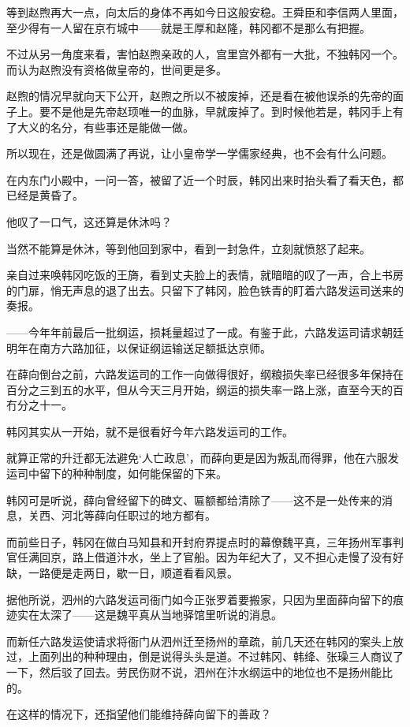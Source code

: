 等到赵煦再大一点，向太后的身体不再如今日这般安稳。王舜臣和李信两人里面，至少得有一人留在京冇城中——就是王厚和赵隆，韩冈都不是那么有把握。

不过从另一角度来看，害怕赵煦亲政的人，宫里宫外都有一大批，不独韩冈一个。而认为赵煦没有资格做皇帝的，世间更是多。

赵煦的情况早就向天下公开，赵煦之所以不被废掉，还是看在被他误杀的先帝的面子上。要不是他是先帝赵顼唯一的血脉，早就废掉了。到时候他若是，韩冈手上有了大义的名分，有些事还是能做一做。

所以现在，还是做圆满了再说，让小皇帝学一学儒家经典，也不会有什么问题。

在内东门小殿中，一问一答，被留了近一个时辰，韩冈出来时抬头看了看天色，都已经是黄昏了。

他叹了一口气，这还算是休沐吗？

当然不能算是休沐，等到他回到家中，看到一封急件，立刻就愤怒了起来。

亲自过来唤韩冈吃饭的王旖，看到丈夫脸上的表情，就暗暗的叹了一声，合上书房的门扉，悄无声息的退了出去。只留下了韩冈，脸色铁青的盯着六路发运司送来的奏报。

——今年年前最后一批纲运，损耗量超过了一成。有鉴于此，六路发运司请求朝廷明年在南方六路加征，以保证纲运输送足额抵达京师。

在薛向倒台之前，六路发运司的工作一向做得很好，纲粮损失率已经很多年保持在百分之三到五的水平，但从今天三月开始，纲运的损失率一路上涨，直至今天的百冇分之十一。

韩冈其实从一开始，就不是很看好今年六路发运司的工作。

就算正常的升迁都无法避免‘人亡政息’，而薛向更是因为叛乱而得罪，他在六服发运司中留下的种种制度，如何能保留的下来。

韩冈可是听说，薛向曾经留下的碑文、匾额都给清除了——这不是一处传来的消息，关西、河北等薛向任职过的地方都有。

而前些日子，韩冈在做白马知县和开封府界提点时的幕僚魏平真，三年扬州军事判官任满回京，路上借道汴水，坐上了官船。因为年纪大了，又不担心走慢了没有好缺，一路便是走两日，歇一日，顺道看看风景。

据他所说，泗州的六路发运司衙门如今正张罗着要搬家，只因为里面薛向留下的痕迹实在太深了——这是魏平真从当地驿馆里听说的消息。

而新任六路发运使请求将衙门从泗州迁至扬州的章疏，前几天还在韩冈的案头上放过，上面列出的种种理由，倒是说得头头是道。不过韩冈、韩绛、张璪三人商议了一下，然后驳了回去。劳民伤财不说，泗州在汴水纲运中的地位也不是扬州能比的。

在这样的情况下，还指望他们能维持薛向留下的善政？


